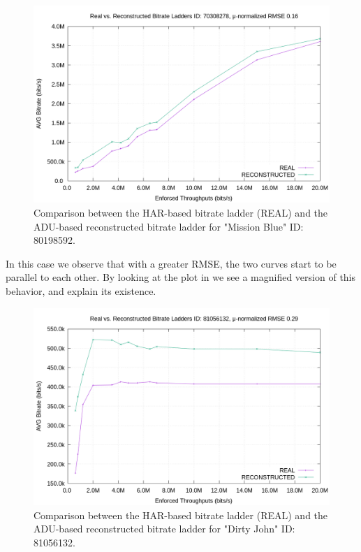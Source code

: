 \newpage
\begin{figure}[H]
  \centering
  \includegraphics[width=\columnwidth]{img/70308278}
  \caption{Comparison between the HAR-based bitrate ladder (REAL) and the
  ADU-based reconstructed bitrate ladder for "Mission Blue" ID: 80198592.}
  \label{fig:bl_comparison_good_2}
\end{figure}

In this case we observe that with a greater RMSE, the two curves start to be
parallel to each other. By looking at the plot in 
we see a magnified version of this behavior, and explain its existence.

\begin{figure}[!h]
  \centering
  \includegraphics[width=\columnwidth]{img/81056132.png}
  \caption{Comparison between the HAR-based bitrate ladder (REAL) and the
  ADU-based reconstructed bitrate ladder for "Dirty John" ID: 81056132.}
  \label{fig:bl_comparison_bad}
\end{figure}

